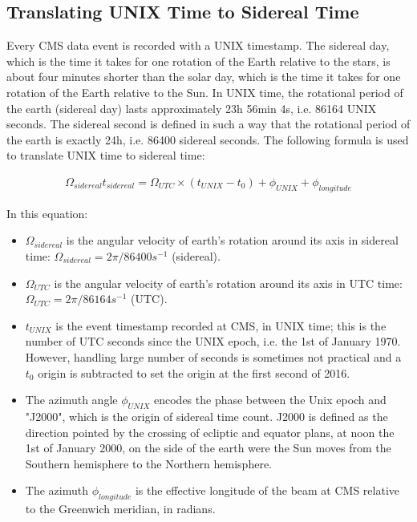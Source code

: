 \subsection{Translating UNIX Time to Sidereal Time}
Every CMS data event is recorded with a UNIX timestamp. 
The sidereal day, which is the time it takes for one rotation of the Earth relative to the stars, is about four minutes shorter than the solar day, which is the time it takes for one rotation of the Earth relative to the Sun.
In UNIX time, the rotational period of the earth (sidereal day) lasts approximately 23h 56min 4s, i.e. 86164 UNIX seconds. 
The sidereal second is defined in such a way that the rotational period of the earth is exactly 24h, i.e. 86400 sidereal seconds.
The following formula is used to translate UNIX time to sidereal time:
\begin{linenomath*}
\begin{align}
\Omega_{sidereal} t_{sidereal} = \Omega_{UTC} \times (t_{UNIX} - t_0) + \phi_{UNIX} + \phi_{longitude}
\end{align}
\end{linenomath*}
In this equation:
\begin{itemize}
\item $\Omega_{sidereal}$ is the angular velocity of earth's rotation around its axis in sidereal time: $\Omega_{sidereal} = 2\pi / 86400 s^{-1}$ (sidereal). 
\item $\Omega_{UTC}$ is the angular velocity of earth's rotation around its axis in UTC time: $\Omega_{UTC} = 2\pi / 86164 s^{-1}$ (UTC). 
\item $t_{UNIX}$ is the event timestamp recorded at CMS, in UNIX time; this is the number of UTC seconds since the UNIX epoch, i.e. the 1st of January 1970. However, handling large number of seconds is sometimes not practical and a $t_0$ origin is subtracted to set the origin at the first second of 2016.
\item The azimuth angle $\phi_{UNIX}$ encodes the phase between the Unix epoch and "J2000", which is the origin of sidereal time count. J2000 is defined as the direction pointed by the crossing of ecliptic and equator plans, at noon the 1st of January 2000, on the side of the earth were the Sun moves from the Southern hemisphere to the Northern hemisphere. 
\item The azimuth $\phi_{longitude}$ is the effective longitude of the beam at CMS relative to the Greenwich meridian, in radians.
\end{itemize}

